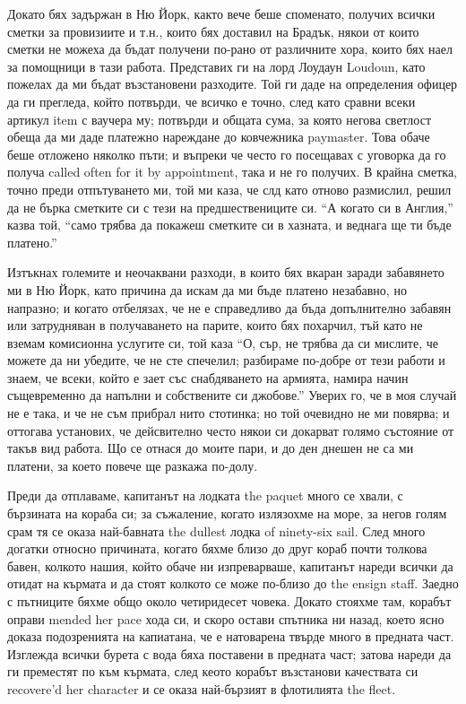 \documentclass[12pt]{book}
\begin{document}
Докато бях задържан в Ню Йорк, както вече беше споменато, получих всички сметки за провизиите и т.н., които бях доставил на Брадък, някои от които сметки не можеха да бъдат получени по-рано от различните хора, които бях наел за помощници в тази работа. Представих ги на лорд Лоудаун Loudoun, като пожелах да ми бъдат възстановени разходите. Той ги даде на определения офицер да ги прегледа, който потвърди, че всичко е точно, след като сравни всеки артикул item с ваучера му; потвърди и общата сума, за която негова светлост обеща да ми даде платежно нареждане до ковчежника paymaster. Това обаче беше отложено няколко пъти;  и въпреки че често го посещавах с уговорка да го получа called often for it by appointment, така и не го получих. В крайна сметка, точно преди отпътуването ми, той ми каза, че слд като отново размислил, решил да не бърка сметките си с тези на предшествениците си. “А когато си в Англия,” казва той, “само трябва да покажеш сметките си в хазната, и веднага ще ти бъде платено.”

Изтъкнах големите и неочаквани разходи, в които бях вкаран заради забавянето ми в Ню Йорк, като причина да искам да ми бъде платено незабавно, но напразно; и когато отбелязах, че не е справедливо да бъда допълнително забавян или затрудняван в получаването на парите, които бях похарчил, тъй като не вземам комисионна услугите си, той каза “О, сър, не трябва да си мислите, че можете да ни убедите, че не сте спечелил; разбираме по-добре от тези работи и знаем, че всеки, който е зает със снабдяването на армията, намира начин същевременно да напълни и собствените си джобове.” Уверих го, че в моя случай не е така, и че не съм прибрал нито стотинка; но той очевидно не ми повярва; и оттогава установих, че дейсвително често някои си докарват голямо състояние от такъв вид работа. Що се отнася до моите пари, и до ден днешен не са ми платени, за което повече ще разкажа по-долу.

Преди да отплаваме, капитанът на лодката the paquet много се хвали, с бързината на кораба си; за съжаление, когато излязохме на море, за негов голям срам тя се оказа най-бавната the dullest лодка of ninety-six sail. След много догатки относно причината, когато бяхме близо до друг кораб почти толкова бавен, колкото нашия, който обаче ни изпреварваше, капитанът нареди всички да отидат на кърмата и да стоят колкото се може по-близо до the ensign staff. Заедно с пътниците бяхме общо около четиридесет човека. Докато стояхме там, корабът оправи mended her pace хода си, и скоро остави спътника ни назад, което ясно доказа подозренията на капиатана, че е натоварена твърде много в предната част. Изглежда всички бурета с вода бяха поставени в предната част; затова нареди да ги преместят по към кърмата, след кеото корабът възстанови качествата си recovere'd her character и се оказа най-бързият в флотилията the fleet. 
\end{document}
